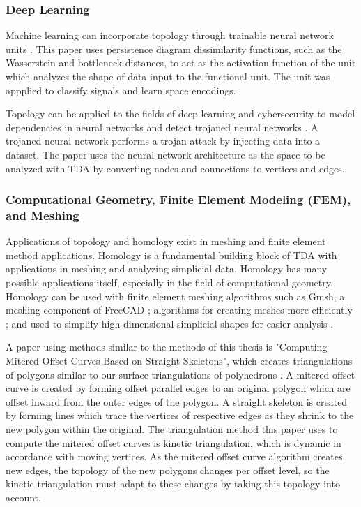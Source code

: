 \documentclass[ma]{uncgdissertationexp}
\theoremstyle{plain}
\theoremstyle{definition}
\theoremstyle{remark}
\begin{document}
\subsubsection{Deep Learning}
\par Machine learning can incorporate topology through trainable neural network units \cite{oballe2021tofu}. This paper uses persistence diagram dissimilarity functions, such as the Wasserstein and bottleneck distances, to act as the activation function of the unit which analyzes the shape of data input to the functional unit. The unit was appplied to classify signals and learn space encodings.
\par Topology can be applied to the fields of deep learning and cybersecurity to model dependencies in neural networks and detect trojaned neural networks \cite{zheng2021topological}. A trojaned neural network performs a trojan attack by injecting data into a dataset. The paper uses the neural network architecture as the space to be analyzed with TDA by converting nodes and connections to vertices and edges.

\subsubsection{Computational Geometry, Finite Element Modeling (FEM), and Meshing}
\par Applications of topology and homology exist in meshing and finite element method applications. Homology is a fundamental building block of TDA with applications in meshing and analyzing simplicial data. Homology has many possible applications itself, especially in the field of computational geometry. Homology can be used with finite element meshing algorithms such as Gmsh, a meshing component of FreeCAD \cite{homology_fem_computation}; algorithms for creating meshes more efficiently \cite{3d_vol_iso_mesh}; and used to simplify high-dimensional simplicial shapes for easier analysis \cite{efficient_homology_preserving} \cite{mesh_enhanced_persistent}.

\par A paper using methods similar to the methods of this thesis is "Computing Mitered Offset Curves Based on Straight Skeletons", which creates triangulations of polygons similar to our surface triangulations of polyhedrons \cite{palfrader2015computing}. A mitered offset curve is created by forming offset parallel edges to an original polygon which are offset inward from the outer edges of the polygon. A straight skeleton is created by forming lines which trace the vertices of respective edges as they shrink to the new polygon within the original. The triangulation method this paper uses to compute the mitered offset curves is kinetic triangulation, which is dynamic in accordance with moving vertices. As the mitered offset curve algorithm creates new edges, the topology of the new polygons changes per offset level, so the kinetic triangulation must adapt to these changes by taking this topology into account.
\end{document}
